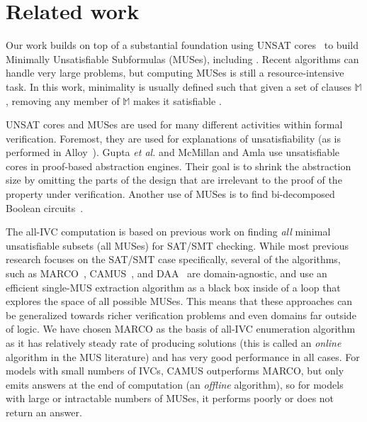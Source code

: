 \section{Related work}
\label{sec:related}

Our work builds on top of a substantial foundation using UNSAT cores~\cite{Cimatti2007:UNSAT} to build Minimally Unsatisfiable Subformulas
(MUSes), including \cite{nadel2014accelerated, belov2013core, belov2012towards, ryvchin2011faster, belov2012computing, marques2010minimal}.  Recent algorithms can handle very large problems, but computing MUSes is still a resource-intensive task.  In this work, minimality is usually defined such that given a set of clauses $\mathbb{M}$, removing any member of $\mathbb{M}$ makes it satisfiable \cite{belov2012computing}.

UNSAT cores and MUSes are used for many different activities within
formal verification.  Foremost, they are used for explanations of unsatisfiability (as is performed in Alloy~\cite{Torlak08:cores}).  Gupta \textit{et al.} \cite{gupta2003iterative} and
McMillan and Amla \cite{mcmillan2003automatic} use
unsatisfiable cores in proof-based abstraction engines. Their goal is
to shrink the abstraction size by omitting the parts of the design
that are irrelevant to the proof of the property under verification.  Another use of MUSes is to find bi-decomposed Boolean circuits~\cite{6081636}.

The all-IVC computation is based on previous work on finding {\em all} minimal unsatisfiable subsets (all MUSes) for SAT/SMT checking.  While most previous research focuses on the SAT/SMT case specifically, several of the algorithms, such as MARCO~\cite{marco2016fast}, CAMUS~\cite{Liffiton2008}, and DAA~\cite{Bailey:2005:DMU:2158261.2158277} are domain-agnostic, and use an efficient single-MUS extraction algorithm as a black box inside of a loop that explores the space of all possible MUSes.  This means that these approaches can be generalized towards richer verification problems and even domains far outside of logic.  We have chosen MARCO as the basis of all-IVC enumeration algorithm as it has relatively steady rate of producing solutions (this is called an {\em online} algorithm in the MUS literature) and has very good performance in all cases.  For models with small numbers of IVCs, CAMUS outperforms MARCO, but only emits answers at the end of computation (an {\em offline} algorithm), so for models with large or intractable numbers of MUSes, it performs poorly or does not return an answer.


